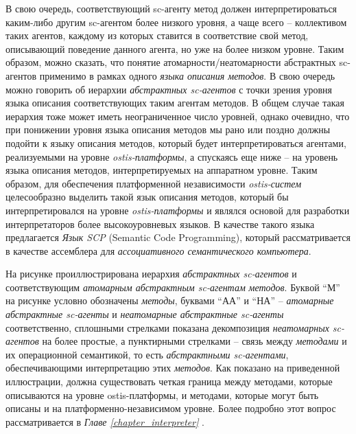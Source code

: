 \begin{textitemize}
	\item В свою очередь, соответствующий sc-агенту метод должен интерпретироваться каким-либо другим sc-агентом более низкого уровня, а чаще всего -- коллективом таких агентов, каждому из которых ставится в соответствие свой метод, описывающий поведение данного агента, но уже на более низком уровне. Таким образом, можно сказать, что понятие атомарности/неатомарности абстрактных sc-агентов применимо в рамках одного \textit{языка описания методов}. В свою очередь можно говорить об иерархии \textit{абстрактных sc-агентов} с точки зрения уровня языка описания соответствующих таким агентам методов. В общем случае такая иерархия тоже может иметь неограниченное число уровней, однако очевидно, что при понижении уровня языка описания методов мы рано или поздно должны подойти к языку описания методов, который будет интерпретироваться агентами, реализуемыми на уровне \textit{ostis-платформы}, а спускаясь еще ниже -- на уровень языка описания методов, интерпретируемых на аппаратном уровне. Таким образом, для обеспечения платформенной независимости \textit{ostis-систем} целесообразно выделить такой язык описания методов, который бы интерпретировался на уровне \textit{ostis-платформы} и являлся основой для разработки интерпретаторов более высокоуровневых языков. В качестве такого языка предлагается \textit{Язык SCP} (Semantic Code Programming), который рассматривается в качестве ассемблера для \textit{ассоциативного семантического компьютера}.
\end{textitemize}

На рисунке \textit{} проиллюстрирована иерархия \textit{абстрактных sc-агентов} и соответствующим \textit{атомарным абстрактным sc-агентам} \textit{методов}. Буквой ``М'' на рисунке условно обозначены \textit{методы}, буквами ``АА'' и ``НА'' -- \textit{атомарные абстрактные sc-агенты} и \textit{неатомарные абстрактные sc-агенты} соответственно, сплошными стрелками показана декомпозиция \textit{неатомарных sc-агентов} на более простые, а пунктирными стрелками -- связь между \textit{методами} и их операционной семантикой, то есть \textit{абстрактными sc-агентами}, обеспечивающими интерпретацию этих \textit{методов}. Как показано на приведенной иллюстрации, должна существовать четкая граница между методами, которые описываются на уровне ostis-платформы, и методами, которые могут быть описаны и на платформенно-независимом уровне. Более подробно этот вопрос рассматривается в \textit{Главе \ref{chapter_interpreter} }.

